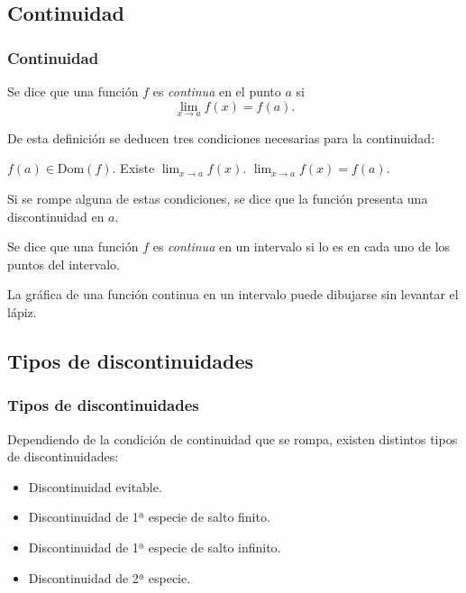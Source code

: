 \subsection{Continuidad}
\begin{frame}
\frametitle{Continuidad}
\begin{definicion}
Se dice que una función $f$ es \emph{continua} en el punto $a$ si
\[ \lim_{x\rightarrow a}f(x)=f(a).\]
\end{definicion}

 De esta definición se deducen tres condiciones necesarias para la continuidad:
\begin{enumerate}
 $f(a)\in \textrm{Dom}(f)$.
 Existe $\displaystyle \lim_{x\rightarrow a}f(x)$.
 $\displaystyle \lim_{x\rightarrow a}f(x)=f(a)$.
\end{enumerate}

Si se rompe alguna de estas condiciones, se dice que la función presenta una discontinuidad en $a$.

\begin{definicion}
Se dice que una función $f$ es \emph{continua} en un intervalo si lo es en cada uno de los puntos del intervalo.
\end{definicion}

La gráfica de una función continua en un intervalo puede dibujarse sin levantar el lápiz.
\end{frame}



\subsection{Tipos de discontinuidades}
\begin{frame}
\frametitle{Tipos de discontinuidades}
Dependiendo de la condición de continuidad que se rompa, existen distintos tipos de  discontinuidades:
\begin{itemize}
\item Discontinuidad evitable.
\item Discontinuidad de 1ª especie de salto finito.
\item Discontinuidad de 1ª especie de salto infinito.
\item Discontinuidad de 2ª especie.
\end{itemize}
\end{frame}


